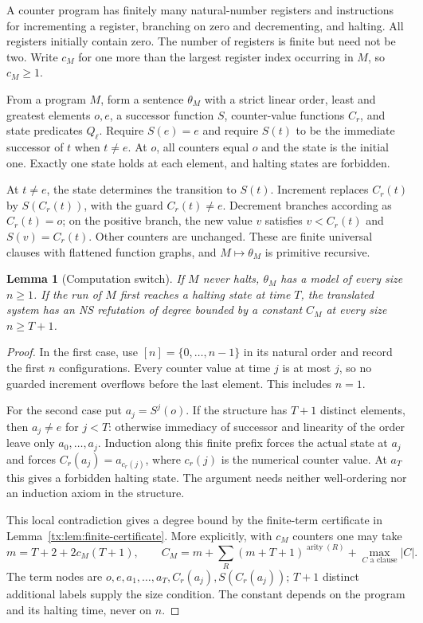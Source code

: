 \documentclass[11pt,a4paper,oneside,openany]{book}
\newtheorem{lemma}[theorem]{Lemma}
\theoremstyle{definition}\newtheorem{definition}[theorem]{Definition}
\theoremstyle{remark}\newtheorem{remark}[theorem]{Remark}
\numberwithin{equation}{chapter}
\begin{document}
A counter program has finitely many natural-number registers and instructions
for incrementing a register, branching on zero and decrementing, and halting.
All registers initially contain zero. The number of registers is finite
but need not be two. Write $c_M$ for one more than the largest register index
occurring in $M$, so $c_M\ge1$.

From a program $M$, form a sentence $\theta_M$ with a strict linear order,
least and greatest elements $o,e$, a successor function $S$, counter-value
functions $C_r$, and state predicates $Q_\ell$. Require $S(e)=e$ and require
$S(t)$ to be the immediate successor of $t$ when $t\ne e$. At $o$, all
counters equal $o$ and the state is the initial one. Exactly one state holds
at each element, and halting states are forbidden.

At $t\ne e$, the state determines the transition to $S(t)$. Increment
replaces $C_r(t)$ by $S(C_r(t))$, with the guard $C_r(t)\ne e$.
Decrement branches according as $C_r(t)=o$; on the positive branch, the new
value $v$ satisfies $v<C_r(t)$ and $S(v)=C_r(t)$. Other counters are
unchanged. These are finite universal clauses with flattened function
graphs, and $M\mapsto\theta_M$ is primitive recursive.

\begin{lemma}[Computation switch]\label{tx:lem:switch}
If $M$ never halts, $\theta_M$ has a model of every size $n\ge1$.
If the run of $M$ first reaches a halting state at time $T$, the translated system has an NS refutation of
degree bounded by a constant $C_M$ at every size $n\ge T+1$.
\end{lemma}
\begin{proof}
In the first case, use $[n]=\{0,\ldots,n-1\}$ in its natural order and
record the first $n$ configurations. Every counter value at time $j$ is at
most $j$, so no guarded increment overflows before the last element.
This includes $n=1$.

For the second case put $a_j=S^j(o)$. If the structure has $T+1$ distinct
elements, then $a_j\ne e$ for $j<T$: otherwise immediacy of successor and
linearity of the order leave only $a_0,\ldots,a_j$. Induction along this
finite prefix forces the actual state at $a_j$ and forces
$C_r(a_j)=a_{c_r(j)}$, where $c_r(j)$ is the numerical counter value.
At $a_T$ this gives a forbidden halting state. The argument needs neither
well-ordering nor an induction axiom in the structure.

This local contradiction gives a degree bound by the finite-term
certificate in Lemma~\ref{tx:lem:finite-certificate}. More explicitly, with $c_M$
counters one may take
\[
 m=T+2+2c_M(T+1),\qquad
 C_M=m+\sum_R(m+T+1)^{\operatorname{arity}(R)}
                  +\max_{C\text{ a clause}}|C|.
\]
The term nodes are $o,e,a_1,\ldots,a_T,C_r(a_j),S(C_r(a_j))$;
$T+1$ distinct additional labels supply the size condition. The constant
depends on the program and its halting time, never on $n$.
\end{proof}
\end{document}
